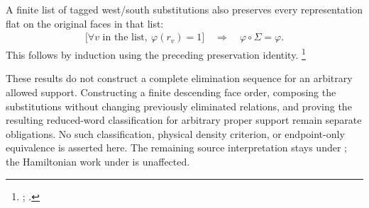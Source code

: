\documentclass{article}
\begin{document}
A finite list of tagged west/south substitutions also preserves every
representation flat on the original faces in that list:
\begin{align}
    \bigl[\forall v\text{ in the list},\ \varphi(r_v)=1\bigr]
    \quad\Longrightarrow\quad\varphi\circ\Sigma=\varphi.
    \label{eq:scp10_face_elimination_sequence}
\end{align}
This follows by induction using the preceding preservation identity.
\footnote{;
.}

These results do not construct a complete elimination sequence for an
arbitrary allowed support. Constructing a finite descending face order, composing the
substitutions without changing previously eliminated relations, and proving
the resulting reduced-word classification for arbitrary proper support
remain separate obligations. No such classification, physical density
criterion, or endpoint-only equivalence is asserted here.
The remaining source interpretation stays under ;
the Hamiltonian work under  is unaffected.



\end{document}
